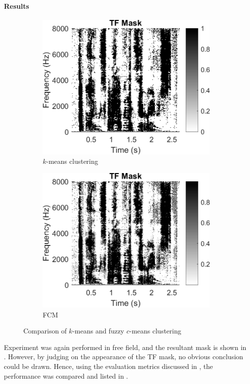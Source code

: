\documentclass[a4paper,twoside,12pt,hidelinks]{article}
\begin{document}
\paragraph{Results}

\begin{figure}[H]
\centering
\begin{subfigure}[H]{0.49\textwidth}
\includegraphics[width=\textwidth]{maskkmeans}
\caption{$k$-means clustering}
\end{subfigure}
\begin{subfigure}[H]{0.49\textwidth}
\includegraphics[width=\textwidth]{maskFCM}
\caption{FCM}
\end{subfigure}
\caption{Comparison of $k$-means and fuzzy $c$-means clustering}
\label{fig:maskfcm}
\end{figure}
Experiment was again performed in free field, and the resultant mask is shown in . However, by judging on the appearance of the TF mask, no obvious conclusion could be drawn. Hence, using the evaluation metrics discussed in , the performance was compared and listed in .
\end{document}
